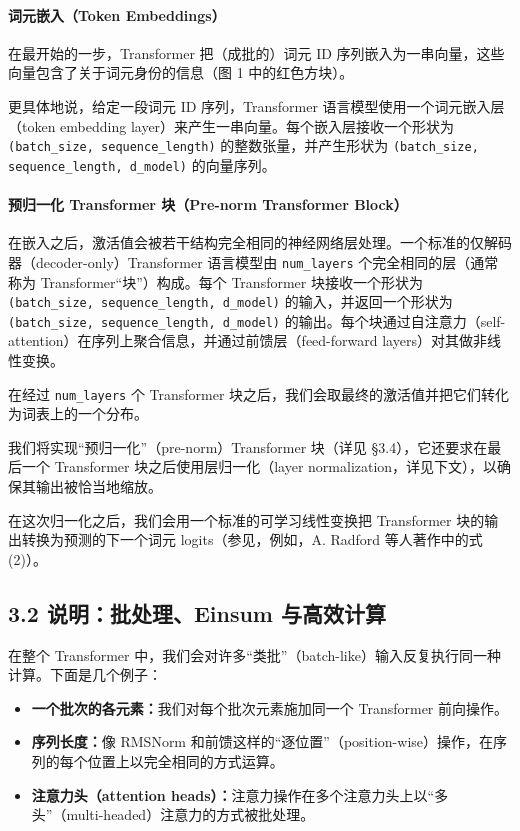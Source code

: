 \paragraph{词元嵌入（Token Embeddings）}
在最开始的一步，Transformer 把（成批的）词元 ID 序列嵌入为一串向量，这些向量包含了关于词元身份的信息（图 1 中的红色方块）。

更具体地说，给定一段词元 ID 序列，Transformer 语言模型使用一个词元嵌入层（token embedding layer）来产生一串向量。每个嵌入层接收一个形状为 \texttt{(batch\_size, sequence\_length)} 的整数张量，并产生形状为 \texttt{(batch\_size, sequence\_length, d\_model)} 的向量序列。

\paragraph{预归一化 Transformer 块（Pre-norm Transformer Block）}
在嵌入之后，激活值会被若干结构完全相同的神经网络层处理。一个标准的仅解码器（decoder-only）Transformer 语言模型由 \texttt{num\_layers} 个完全相同的层（通常称为 Transformer“块”）构成。每个 Transformer 块接收一个形状为 \texttt{(batch\_size, sequence\_length, d\_model)} 的输入，并返回一个形状为 \texttt{(batch\_size, sequence\_length, d\_model)} 的输出。每个块通过自注意力（self-attention）在序列上聚合信息，并通过前馈层（feed-forward layers）对其做非线性变换。

在经过 \texttt{num\_layers} 个 Transformer 块之后，我们会取最终的激活值并把它们转化为词表上的一个分布。

我们将实现“预归一化”（pre-norm）Transformer 块（详见 §3.4），它还要求在最后一个 Transformer 块之后使用层归一化（layer normalization，详见下文），以确保其输出被恰当地缩放。

在这次归一化之后，我们会用一个标准的可学习线性变换把 Transformer 块的输出转换为预测的下一个词元 logits（参见，例如，A. Radford 等人著作中的式 (2)）。

\subsection*{3.2 说明：批处理、Einsum 与高效计算}

在整个 Transformer 中，我们会对许多“类批”（batch-like）输入反复执行同一种计算。下面是几个例子：

\begin{itemize}
\item \textbf{一个批次的各元素：}我们对每个批次元素施加同一个 Transformer 前向操作。
\item \textbf{序列长度：}像 RMSNorm 和前馈这样的“逐位置”（position-wise）操作，在序列的每个位置上以完全相同的方式运算。
\item \textbf{注意力头（attention heads）：}注意力操作在多个注意力头上以“多头”（multi-headed）注意力的方式被批处理。
\end{itemize}

